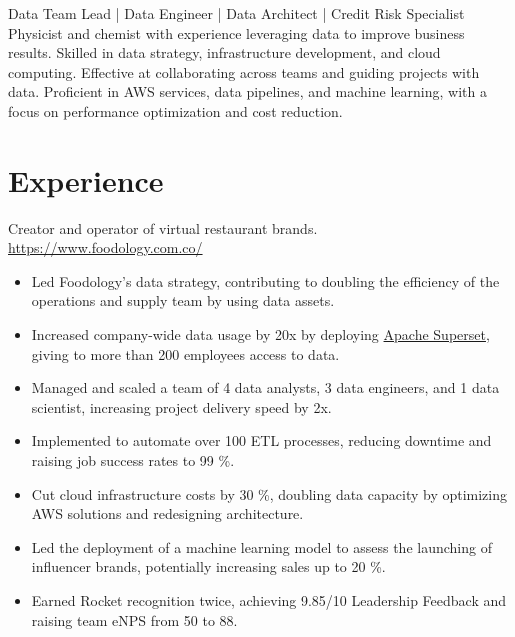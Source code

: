 \documentclass[11pt, letterpaper, sans]{moderncv}
\begin{document}
\maketitle
Data Team Lead | Data Engineer | Data Architect | Credit Risk Specialist
\vspace{0.5cm}
\\
\small{
Physicist and chemist with experience leveraging data to improve business results. Skilled in data strategy, infrastructure development, and cloud computing. Effective at collaborating across teams and guiding projects with data. Proficient in AWS services, data pipelines, and machine learning, with a focus on performance optimization and cost reduction.
}

\section{Experience}
    {
        Creator and operator of virtual restaurant brands. \url{https://www.foodology.com.co/}
        \vspace{3pt}
        \begin{itemize}
            \item Led Foodology's data strategy, contributing to doubling the efficiency of the operations and supply team by using data assets.
            \item Increased company-wide data usage by 20x by deploying \href{https://superset.apache.org/}{\color{color3} Apache Superset}, giving to more than 200 employees access to data.
            \item Managed and scaled a team of 4 data analysts, 3 data engineers, and 1 data scientist, increasing project delivery speed by 2x.
            \item Implemented \href{https://airflow.apache.org/}{\color{color3}{Apache Airflow}} to automate over 100 ETL processes, reducing downtime and raising job success rates to 99 \%.
            \item Cut cloud infrastructure costs by 30 \%, doubling data capacity by optimizing AWS solutions and redesigning architecture.
            \item Led the deployment of a machine learning model to assess the launching of influencer brands, potentially increasing sales up to 20 \%.
            \item Earned Rocket recognition twice, achieving 9.85/10 Leadership Feedback and raising team eNPS from 50 to 88.
        \end{itemize}
    }
\end{document}
